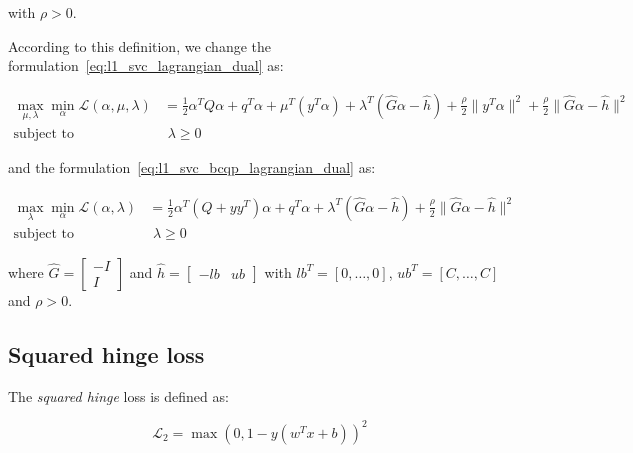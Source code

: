 with $\rho > 0$.

\bigskip

According to this definition, we change the formulation~\ref{eq:l1_svc_lagrangian_dual} as:

\begin{equation} \label{eq:l1_svc_aug_lagrangian_dual}
	\begin{aligned}
		    \max_{\mu,\lambda} \min_{\alpha} \mathcal{L}(\alpha,\mu,\lambda) &= \frac{1}{2} \alpha^T Q\alpha+q^T\alpha + \mu^T (y^T \alpha) + \lambda^T (\hat{G} \alpha - \hat{h}) + \frac{\rho}{2} \| y^T \alpha \|^2 + \frac{\rho}{2} \| \hat{G} \alpha - \hat{h} \|^2 \\
    \text{subject to} \quad & \,\, \lambda \geq 0
	\end{aligned}
\end{equation}

and the formulation~\ref{eq:l1_svc_bcqp_lagrangian_dual} as:

\begin{equation} \label{eq:l1_svc_bcqp_aug_lagrangian_dual}
	\begin{aligned}
    	\max_{\lambda} \min_{\alpha} \mathcal{L}(\alpha,\lambda) &= \frac{1}{2} \alpha^T (Q + yy^T) \alpha + q^T \alpha + \lambda^T (\hat{G} \alpha - \hat{h}) + \frac{\rho}{2} \| \hat{G} \alpha - \hat{h} \|^2 \\
    \text{subject to} \quad & \,\, \lambda \geq 0
	\end{aligned}
\end{equation}

where $\hat{G} =
\begin{bmatrix}
-I \\
 I 
\end{bmatrix}$ and $\hat{h} =
\begin{bmatrix}
-lb & ub
\end{bmatrix}$ with $lb^T = [0, \dots, 0]$, $ub^T = [C, \dots, C]$ and $\rho > 0$.

\pagebreak

\subsection{Squared hinge loss}

The \emph{squared hinge} loss is defined as:

\begin{equation} \label{eq:squared_hinge_loss2}
	\mathcal{L}_2 = \max(0, 1 - y (w^T x + b))^2
\end{equation}

